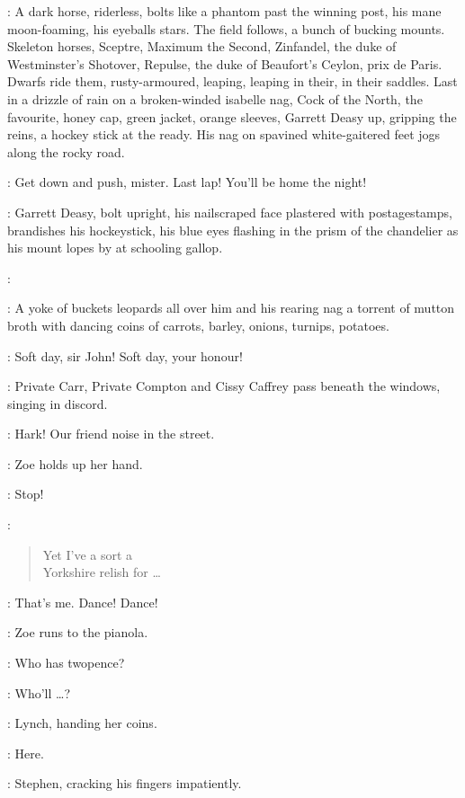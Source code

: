 :
A dark horse, riderless, bolts like a phantom past the winning post,
his mane moon-foaming, his eyeballs stars.
The field follows, a bunch of bucking mounts.
Skeleton horses, Sceptre, Maximum the Second, Zinfandel,
the duke of Westminster's Shot\-over, Repulse,
the duke of Beaufort's Ceylon, prix de Paris.
Dwarfs ride them, rusty-armoured, leaping, leaping in their, in their saddles.
Last in a drizzle of rain on a broken-winded isabelle nag,
Cock of the North, the favourite, honey cap, green jacket,
orange sleeves, Garrett Deasy up, gripping the reins, a hockey stick at the ready.
His nag on spavined white-gaitered feet jogs along the rocky road.

\OrangeLodges[2]:
Get down and push, mister.
Last lap!
You'll be home the night!

:
Garrett Deasy, bolt upright, his nailscraped face plastered with postagestamps,
brandishes his hockeystick, his blue eyes flashing
in the prism of the chandelier as his mount lopes by at schooling gallop.

\GarrettDeasy:

:
A yoke of buckets leopards all over him and his rearing nag
a torrent of mutton broth with dancing coins
of carrots, barley, onions, turnips, potatoes.

\GreenLodges[2]:
Soft day, sir John!
Soft day, your honour!

:
Private Carr, Private Compton and Cissy Caffrey pass beneath the windows,
singing in discord.

\Stephen:
Hark!
Our friend noise in the street.

:
Zoe holds up her hand.

\Zoe:
Stop!

\CarrComptonCissy[2]:
\begin{verse}
    Yet I've a sort a\\
    Yorkshire relish for \ldots
\end{verse}

\Zoe:
That's me.
Dance!
Dance!

:
Zoe runs to the pianola.

\Zoe:
Who has twopence?

\Bloom:
Who'll \ldots?

:
Lynch, handing her coins.

\Lynch:
Here.

:
Stephen, cracking his fingers impatiently.

